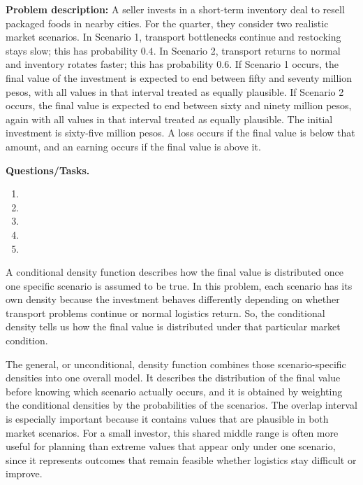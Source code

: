 \textbf{Problem description:}
A seller invests in a short-term inventory deal to resell packaged foods in nearby cities. For the quarter, they consider two realistic market scenarios. In Scenario 1, transport bottlenecks continue and restocking stays slow; this has probability $0.4$. In Scenario 2, transport returns to normal and inventory rotates faster; this has probability $0.6$. If Scenario 1 occurs, the final value of the investment is expected to end between fifty and seventy million pesos, with all values in that interval treated as equally plausible. If Scenario 2 occurs, the final value is expected to end between sixty and ninety million pesos, again with all values in that interval treated as equally plausible. The initial investment is sixty-five million pesos. A loss occurs if the final value is below that amount, and an earning occurs if the final value is above it.

\textbf{Questions/Tasks.}
\begin{enumerate}[label=\textbf{\alph*)}]
	\item {}
	\item {}
	\item {}
	\item {}
	\item {}
\end{enumerate}

A conditional density function describes how the final value is distributed once one specific scenario is assumed to be true. In this problem, each scenario has its own density because the investment behaves differently depending on whether transport problems continue or normal logistics return. So, the conditional density tells us how the final value is distributed under that particular market condition.

The general, or unconditional, density function combines those scenario-specific densities into one overall model. It describes the distribution of the final value before knowing which scenario actually occurs, and it is obtained by weighting the conditional densities by the probabilities of the scenarios. The overlap interval is especially important because it contains values that are plausible in both market scenarios. For a small investor, this shared middle range is often more useful for planning than extreme values that appear only under one scenario, since it represents outcomes that remain feasible whether logistics stay difficult or improve.


